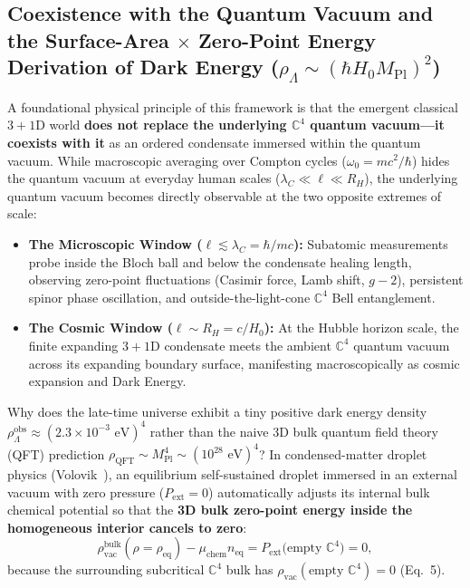 \documentclass[11pt,a4paper]{article}
\begin{document}
\subsection{Coexistence with the Quantum Vacuum and the Surface-Area \texorpdfstring{$\times$}{x} Zero-Point Energy Derivation of Dark Energy (\texorpdfstring{$\rho_\Lambda \sim (\hbar H_0 M_{\text{Pl}})^2$}{rho\_Lambda ~ (hbar H\_0 M\_Pl)\^2})}
A foundational physical principle of this framework is that the emergent classical $3+1\text{D}$ world \textbf{does not replace the underlying $\mathbb{C}^4$ quantum vacuum---it coexists with it} as an ordered condensate immersed within the quantum vacuum. While macroscopic averaging over Compton cycles ($\omega_0 = mc^2/\hbar$) hides the quantum vacuum at everyday human scales ($\lambda_C \ll \ell \ll R_H$), the underlying quantum vacuum becomes directly observable at the two opposite extremes of scale:
\begin{itemize}
    \item \textbf{The Microscopic Window ($\ell \lesssim \lambda_C = \hbar/mc$):} Subatomic measurements probe inside the Bloch ball and below the condensate healing length, observing zero-point fluctuations (Casimir force, Lamb shift, $g-2$), persistent spinor phase oscillation, and outside-the-light-cone $\mathbb{C}^4$ Bell entanglement.
    \item \textbf{The Cosmic Window ($\ell \sim R_H = c/H_0$):} At the Hubble horizon scale, the finite expanding $3+1\text{D}$ condensate meets the ambient $\mathbb{C}^4$ quantum vacuum across its expanding boundary surface, manifesting macroscopically as cosmic expansion and Dark Energy.
\end{itemize}

Why does the late-time universe exhibit a tiny positive dark energy density $\rho_\Lambda^{\text{obs}} \approx (2.3 \times 10^{-3}\text{ eV})^4$ rather than the naive 3D bulk quantum field theory (QFT) prediction $\rho_{\text{QFT}} \sim M_{\text{Pl}}^4 \sim (10^{28}\text{ eV})^4$? In condensed-matter droplet physics (Volovik~\cite{Volovik2003}), an equilibrium self-sustained droplet immersed in an external vacuum with zero pressure ($P_{\text{ext}} = 0$) automatically adjusts its internal bulk chemical potential so that the \textbf{3D bulk zero-point energy inside the homogeneous interior cancels to zero}:
\begin{equation}
\rho_{\text{vac}}^{\text{bulk}}(\rho = \rho_{\text{eq}}) - \mu_{\text{chem}} n_{\text{eq}} = P_{\text{ext}}\big(\text{empty }\mathbb{C}^4\big) = 0,
\end{equation}
because the surrounding subcritical $\mathbb{C}^4$ bulk has $\rho_{\text{vac}}(\text{empty }\mathbb{C}^4) = 0$ (Eq.\ 5).
\end{document}
